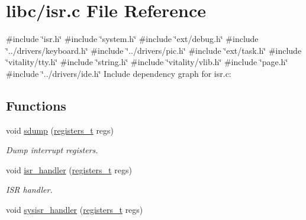 \hypertarget{a00092}{}\section{libc/isr.c File Reference}
\label{a00092}
{\ttfamily \#include \char`\"{}isr.\+h\char`\"{}}\newline
{\ttfamily \#include \char`\"{}system.\+h\char`\"{}}\newline
{\ttfamily \#include \char`\"{}ext/debug.\+h\char`\"{}}\newline
{\ttfamily \#include \char`\"{}../drivers/keyboard.\+h\char`\"{}}\newline
{\ttfamily \#include \char`\"{}../drivers/pic.\+h\char`\"{}}\newline
{\ttfamily \#include \char`\"{}ext/task.\+h\char`\"{}}\newline
{\ttfamily \#include \char`\"{}vitality/tty.\+h\char`\"{}}\newline
{\ttfamily \#include \char`\"{}string.\+h\char`\"{}}\newline
{\ttfamily \#include \char`\"{}vitality/vlib.\+h\char`\"{}}\newline
{\ttfamily \#include \char`\"{}page.\+h\char`\"{}}\newline
{\ttfamily \#include \char`\"{}../drivers/ide.\+h\char`\"{}}\newline
Include dependency graph for isr.\+c\+:
\subsection*{Functions}
\begin{DoxyCompactItemize}
\item 
void \hyperlink{a00092_a4b4233daef6e041e7278cae2b21b5ed4_a4b4233daef6e041e7278cae2b21b5ed4}{sdump} (\hyperlink{a00095_adf58dbaf6139b4957c348711f2026957_adf58dbaf6139b4957c348711f2026957}{registers\+\_\+t} regs)
\begin{DoxyCompactList}\small\item\em Dump interrupt registers. \end{DoxyCompactList}\item 
void \hyperlink{a00092_a700e3ca056bf69296370f504f2cb6cc8_a700e3ca056bf69296370f504f2cb6cc8}{isr\+\_\+handler} (\hyperlink{a00095_adf58dbaf6139b4957c348711f2026957_adf58dbaf6139b4957c348711f2026957}{registers\+\_\+t} regs)
\begin{DoxyCompactList}\small\item\em I\+SR handler. \end{DoxyCompactList}\item 
void \hyperlink{a00092_abd1fa375737cd5ecd84c082738e3b195_abd1fa375737cd5ecd84c082738e3b195}{sysisr\+\_\+handler} (\hyperlink{a00095_adf58dbaf6139b4957c348711f2026957_adf58dbaf6139b4957c348711f2026957}{registers\+\_\+t} regs)
\end{DoxyCompactItemize}


